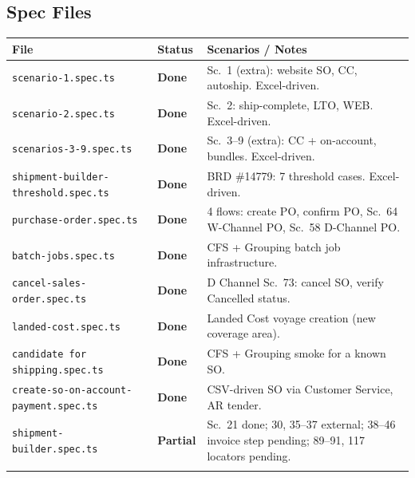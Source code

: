 \documentclass[a4paper,11pt]{article}
\begin{document}
\subsection{Spec Files}

\renewcommand{\arraystretch}{1.3}
\begin{longtable}{p{} p{} p{}}
\toprule
\textbf{File} & \textbf{Status} & \textbf{Scenarios / Notes} \\
\midrule
\endhead
\texttt{scenario-1.spec.ts} & \textcolor{statusGreen}{\textbf{Done}} & Sc.\ 1 (extra): website SO, CC, autoship. Excel-driven. \\\relax
\cmidrule{1-3}
\texttt{scenario-2.spec.ts} & \textcolor{statusGreen}{\textbf{Done}} & Sc.\ 2: ship-complete, LTO, WEB. Excel-driven. \\\relax
\cmidrule{1-3}
\texttt{scenarios-3-9.spec.ts} & \textcolor{statusGreen}{\textbf{Done}} & Sc.\ 3--9 (extra): CC + on-account, bundles. Excel-driven. \\\relax
\cmidrule{1-3}
\texttt{shipment-builder-threshold.spec.ts} & \textcolor{statusGreen}{\textbf{Done}} & BRD \#14779: 7 threshold cases. Excel-driven. \\\relax
\cmidrule{1-3}
\texttt{purchase-order.spec.ts} & \textcolor{statusGreen}{\textbf{Done}} & 4 flows: create PO, confirm PO, Sc.\ 64 W-Channel PO, Sc.\ 58 D-Channel PO. \\\relax
\cmidrule{1-3}
\texttt{batch-jobs.spec.ts} & \textcolor{statusGreen}{\textbf{Done}} & CFS + Grouping batch job infrastructure. \\\relax
\cmidrule{1-3}
\texttt{cancel-sales-order.spec.ts} & \textcolor{statusGreen}{\textbf{Done}} & D Channel Sc.\ 73: cancel SO, verify Cancelled status. \\\relax
\cmidrule{1-3}
\texttt{landed-cost.spec.ts} & \textcolor{statusGreen}{\textbf{Done}} & Landed Cost voyage creation (new coverage area). \\\relax
\cmidrule{1-3}
\texttt{candidate for shipping.spec.ts} & \textcolor{statusGreen}{\textbf{Done}} & CFS + Grouping smoke for a known SO. \\\relax
\cmidrule{1-3}
\texttt{create-so-on-account-payment.spec.ts} & \textcolor{statusGreen}{\textbf{Done}} & CSV-driven SO via Customer Service, AR tender. \\\relax
\cmidrule{1-3}
\texttt{shipment-builder.spec.ts} & \textcolor{statusYellow}{\textbf{Partial}} & Sc.\ 21 done; 30, 35--37 external; 38--46 invoice step pending; 89--91, 117 locators pending. \\\relax

\end{longtable}
\end{document}
